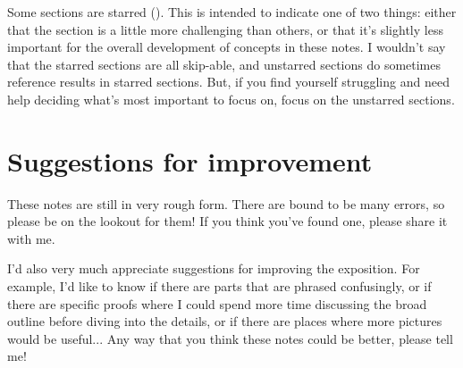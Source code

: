 Some sections are starred (\starred). This is intended to indicate one of two things: either that the section is a little more challenging than others, or that it's slightly less important for the overall development of concepts in these notes. I wouldn't say that the starred sections are all skip-able, and unstarred sections do sometimes reference results in starred sections. But, if you find yourself struggling and need help deciding what's most important to focus on, focus on the unstarred sections. 

\section*{Suggestions for improvement}

These notes are still in very rough form. There are bound to be many errors, so please be on the lookout for them! If you think you've found one, please share it with me. 

I'd also very much appreciate suggestions for improving the exposition. For example, I'd like to know if there are parts that are phrased confusingly, or if there are specific proofs where I could spend more time discussing the broad outline before diving into the details, or if there are places where more pictures would be useful... Any way that you think these notes could be better, please tell me!
